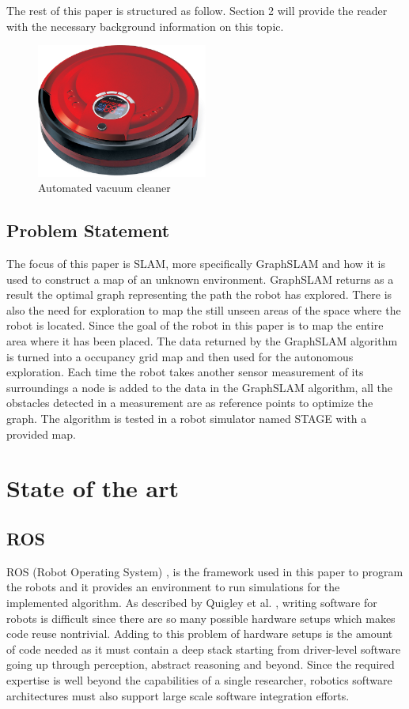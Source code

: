 \documentclass{ba-kecs}
\begin{document}
The rest of this paper is structured as follow. Section 2 will provide the reader with the necessary background information on this topic.

\begin{figure}[htp]
	\centering
		\includegraphics[width=0.50\textwidth]{figures/vacuum_cleaner.jpg}
	\caption{Automated vacuum cleaner}
	\label{fig:vacuum_cleaner}
\end{figure}

\subsection{Problem Statement}
The focus of this paper is SLAM, more specifically GraphSLAM and how it is used to construct a map of an unknown environment. GraphSLAM returns as a result the optimal graph representing the path the robot has explored. There is also the need for exploration to map the still unseen areas of the space where the robot is located. Since the goal of the robot in this paper is to map the entire area where it has been placed. The data returned by the GraphSLAM algorithm is turned into a occupancy grid map and then used for the autonomous exploration. Each time the robot takes another sensor measurement of its surroundings a node is added to the data in the GraphSLAM algorithm, all the obstacles detected in a measurement are as reference points to optimize the graph. The algorithm is tested in a robot simulator named STAGE with a provided map.

\section{State of the art}
\subsection{ROS}
ROS (Robot Operating System) \cite{Quigley}, is the framework used in this paper to program the robots and it provides an environment to run simulations for the implemented algorithm. As described by Quigley et al. \cite{Quigley}, writing software for robots is difficult since there are so many possible hardware setups which makes code reuse nontrivial. Adding to this problem of hardware setups is the amount of code needed as it must contain a deep stack starting from driver-level software going up through perception, abstract reasoning and beyond. Since the required expertise is well beyond the capabilities of a single researcher, robotics software architectures must also support large scale software integration efforts.
\end{document}
